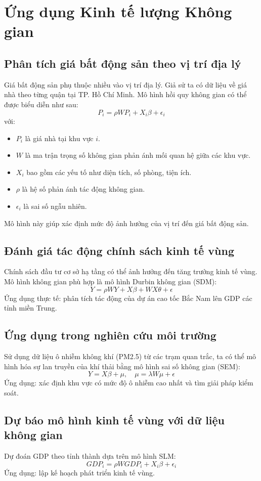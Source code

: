 \chapter{Ứng dụng Kinh tế lượng Không gian}
\section{Phân tích giá bất động sản theo vị trí địa lý}
Giá bất động sản phụ thuộc nhiều vào vị trí địa lý. Giả sử ta có dữ liệu về giá nhà theo từng quận tại TP. Hồ Chí Minh. Mô hình hồi quy không gian có thể được biểu diễn như sau:
\begin{equation}
    P_i = \rho W P_i + X_i \beta + \epsilon_i
\end{equation}
với:
\begin{itemize}
    \item $P_i$ là giá nhà tại khu vực $i$.
    \item $W$ là ma trận trọng số không gian phản ánh mối quan hệ giữa các khu vực.
    \item $X_i$ bao gồm các yếu tố như diện tích, số phòng, tiện ích.
    \item $\rho$ là hệ số phản ánh tác động không gian.
    \item $\epsilon_i$ là sai số ngẫu nhiên.
\end{itemize}
Mô hình này giúp xác định mức độ ảnh hưởng của vị trí đến giá bất động sản.

\section{Đánh giá tác động chính sách kinh tế vùng}
Chính sách đầu tư cơ sở hạ tầng có thể ảnh hưởng đến tăng trưởng kinh tế vùng. Mô hình không gian phù hợp là mô hình Durbin không gian (SDM):
\begin{equation}
    Y = \rho W Y + X \beta + W X \theta + \epsilon
\end{equation}
Ứng dụng thực tế: phân tích tác động của dự án cao tốc Bắc Nam lên GDP các tỉnh miền Trung.

\section{Ứng dụng trong nghiên cứu môi trường}
Sử dụng dữ liệu ô nhiễm không khí (PM2.5) từ các trạm quan trắc, ta có thể mô hình hóa sự lan truyền của khí thải bằng mô hình sai số không gian (SEM):
\begin{equation}
    Y = X\beta + \mu, \quad \mu = \lambda W\mu + \epsilon
\end{equation}
Ứng dụng: xác định khu vực có mức độ ô nhiễm cao nhất và tìm giải pháp kiểm soát.

\section{Dự báo mô hình kinh tế vùng với dữ liệu không gian}
Dự đoán GDP theo tỉnh thành dựa trên mô hình SLM:
\begin{equation}
    GDP_i = \rho W GDP_i + X_i \beta + \epsilon_i
\end{equation}
Ứng dụng: lập kế hoạch phát triển kinh tế vùng.